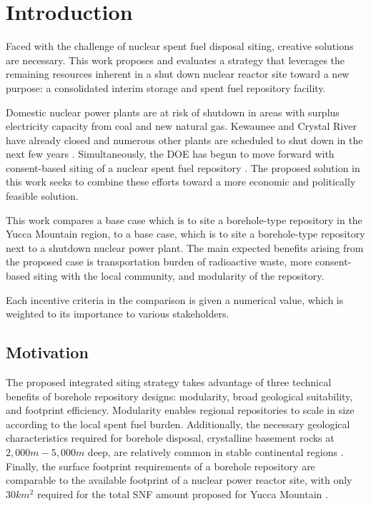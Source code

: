 
\section{Introduction}
Faced with the challenge of nuclear spent fuel disposal siting, creative solutions 
are necessary. This work proposes and evaluates a strategy that leverages the 
remaining resources inherent in a shut down nuclear reactor site toward a new 
purpose: a consolidated interim storage and spent fuel repository facility.

Domestic nuclear power plants are at risk of shutdown in areas with surplus 
electricity capacity from coal and new natural gas. Kewaunee and Crystal River 
have already closed  and numerous other plants are scheduled to shut down in 
the next few years \cite{nei_shutdowns_2016}.  Simultaneously, the \gls{DOE} 
has begun to move forward with consent-based siting of a nuclear 
spent fuel repository \cite{doe_consent_2016}. The proposed solution in this 
work seeks to combine these efforts toward a more economic and politically 
feasible solution. 

This work compares a base case which is to site a borehole-type repository in the
 Yucca Mountain region, to a base case, which is to site a borehole-type repository
 next to a shutdown nuclear power plant. The main expected benefits arising from the
 proposed case is transportation burden of radioactive waste, more consent-based
 siting with the local community, and modularity of the repository. 

Each incentive criteria in the comparison is given a numerical value, which is
weighted to its importance to various stakeholders. 

\subsection{Motivation}
The proposed integrated siting strategy takes advantage of three technical 
benefits of borehole repository designs: modularity, broad geological 
suitability, and footprint efficiency. Modularity enables regional repositories 
to scale in size according to the local spent fuel burden. 
Additionally, the necessary geological characteristics required for borehole 
disposal, crystalline basement rocks at $2,000 m - 5,000 m$ deep, are relatively 
common in stable continental regions \cite{arnold_research_2012}. Finally, the 
surface footprint requirements of a borehole repository are comparable to the 
available footprint of a nuclear power reactor site, with only $30 km^2$ 
required for the total \gls{SNF} amount proposed for Yucca Mountain 
\cite{brady_deep_2009}.

